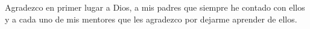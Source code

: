 \begin{agradecimientos}
Agradezco en primer lugar a Dios, a mis padres que siempre he contado con ellos y a cada uno de mis mentores que les agradezco por dejarme aprender de ellos.
\end{agradecimientos}
